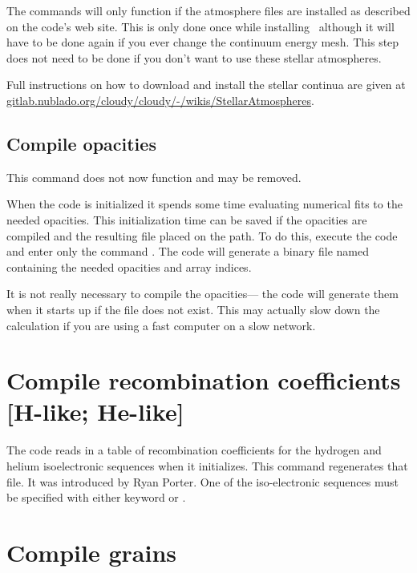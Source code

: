 The  commands will only function
if the atmosphere files
are installed as described on the code's web site.
This is only done once
while installing \Cloudy\ although it will have to be
done again if you ever
change the continuum energy mesh.
This step does not need to be done if
you don't want to use these stellar atmospheres.

Full instructions on how to download and install the stellar continua
are given at
\href{https://gitlab.nublado.org/cloudy/cloudy/-/wikis/StellarAtmospheres}{gitlab.nublado.org/cloudy/cloudy/-/wikis/StellarAtmospheres}.

\begin{shaded}
\section{Compile opacities}

 This command does not now function and may be removed.

When the code is initialized it spends some time evaluating numerical
fits to the needed opacities.
This initialization time can be saved if
the opacities are compiled and the resulting file placed on the path.
To
do this, execute the code and enter only the command
.
The code will generate a binary file named 
containing the needed opacities and array indices.

  It is not really necessary to compile the opacities---
the code
will generate them when it starts up if the file does not exist.
This may
actually slow down the calculation if you are using a fast computer on a
slow network.
\end{shaded}

\section{Compile recombination coefficients [H-like; He-like]}

The code reads in a table of recombination coefficients for the hydrogen and
helium isoelectronic sequences when it initializes.
This command regenerates that file.
It was
introduced by Ryan Porter.
One of the iso-electronic sequences must be
specified with either keyword  or .

\section{Compile grains}
\label{sec:CompileGrains}


